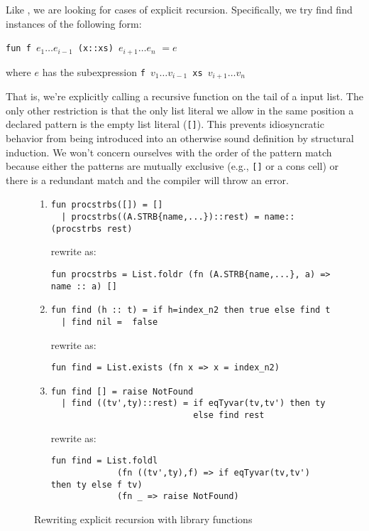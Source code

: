 \documentclass[12pt,abstracton]{scrartcl}
\begin{document}
Like \cite{Jeu13}, we are looking for cases of explicit recursion. Specifically, we try find
find instances of the following form:
\begin{center}
\texttt{fun f }\(e_{1}\ldots e_{i-1}\)\texttt{ (x::xs) }\(e_{i+1}\ldots e_{n}\) \(= e\)

where $e$ has the subexpression \texttt{f }\(v_{1}\ldots v_{i-1}\)\texttt{ xs }\(v_{i+1}\ldots v_{n}\)
\end{center}
That is, we're explicitly calling a recursive function on the tail of a input list.
The only other restriction is that the only list literal we allow in the same position
a declared pattern is the empty list literal (\texttt{[]}). This prevents idiosyncratic
behavior from being introduced into an otherwise sound definition by structural induction.
We won't concern ourselves with the order of the pattern match because either the patterns
are mutually exclusive (e.g., \texttt{[]} or a cons cell) or there is a redundant match
and the compiler will throw an error.

\begin{figure}[h!]
\begin{enumerate}
\item \begin{verbatim}
fun procstrbs([]) = []
  | procstrbs((A.STRB{name,...})::rest) = name::(procstrbs rest)
\end{verbatim}

rewrite as:
\begin{verbatim}
fun procstrbs = List.foldr (fn (A.STRB{name,...}, a) => name :: a) []
\end{verbatim}
\item \begin{verbatim}
fun find (h :: t) = if h=index_n2 then true else find t
  | find nil =  false
\end{verbatim}

rewrite as:
\begin{verbatim}
fun find = List.exists (fn x => x = index_n2)
\end{verbatim}
\item \begin{verbatim}
fun find [] = raise NotFound
  | find ((tv',ty)::rest) = if eqTyvar(tv,tv') then ty
                            else find rest
\end{verbatim}

rewrite as:
\begin{verbatim}
fun find = List.foldl
             (fn ((tv',ty),f) => if eqTyvar(tv,tv') then ty else f tv)
             (fn _ => raise NotFound)
\end{verbatim}
\end{enumerate}
\caption{Rewriting explicit recursion with library functions}
\label{figure:fold}
\end{figure}
\end{document}
